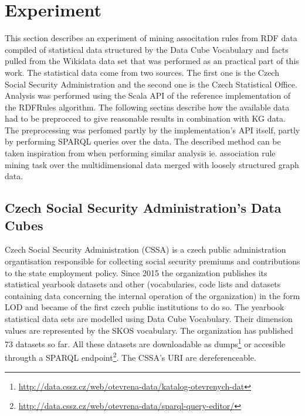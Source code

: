 \chapter{Experiment}


This section describes an experiment of mining associtation rules from RDF data compiled of statistical data structured by the Data Cube Vocabulary and facts pulled from the Wikidata data set that was performed as an practical part of this work. The statistical data come from two sources. The first one is the Czech Social Security Administration and the second one is the Czech Statistical Office. Analysis was performed using the Scala API of the reference implementation of the RDFRules algorithm. The following sectins describe how the available data had to be preprocced to give reasonable results in combination with KG data. The preprocessing was perfomed partly by the implementation's API itself, partly by performing SPARQL queries over the data. The described method can be taken inspiration from when performing similar analysis ie. association rule mining task over the multidimensional data merged with loosely structured graph data. 

\section{Czech Social Security Administration's Data Cubes}

Czech Social Security Administration (CSSA) is a czech public administration organtisation responsible for collecting social security premiums and contributions to the state employment policy. Since 2015 the organization publishes its statistical yearbook datasets and other (vocabularies, code lists and datasets containing data concerning the internal operation of the organization) in the form LOD and became of the first czech public institutions to do so. The yearbook statistical data sets are modelled using Data Cube Vocabulary. Their dimension values are represented by the SKOS vocabulary. The organization has published 73 datasets so far. All these datasets are downloadable as dumps\footnote{\href{http://data.cssz.cz/web/otevrena-data/katalog-otevrenych-dat}{http://data.cssz.cz/web/otevrena-data/katalog-otevrenych-dat}} or accesible througth a SPARQL endpoint\footnote{\href{http://data.cssz.cz/web/otevrena-data/sparql-query-editor/}{http://data.cssz.cz/web/otevrena-data/sparql-query-editor/}}. The CSSA's URI are dereferenceable.

